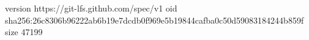 version https://git-lfs.github.com/spec/v1
oid sha256:26c8306b96222ab6b19e7dcdb0f969e5b19844cafba0c50d59083184244b859f
size 47199

